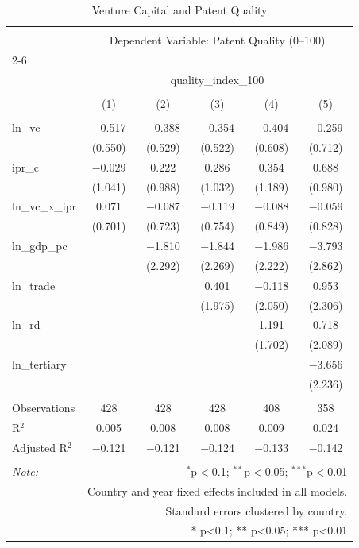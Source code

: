 
\begin{table}[!htbp] \centering 
  \caption{Venture Capital and Patent Quality} 
  \label{} 
\begin{tabular}{@{\extracolsep{5pt}}lccccc} 
\\[-1.8ex]\hline 
\hline \\[-1.8ex] 
 & \multicolumn{5}{c}{Dependent Variable: Patent Quality (0–100)} \\ 
\cline{2-6} 
\\[-1.8ex] & \multicolumn{5}{c}{quality\_index\_100} \\ 
\\[-1.8ex] & (1) & (2) & (3) & (4) & (5)\\ 
\hline \\[-1.8ex] 
 ln\_vc & $-$0.517 & $-$0.388 & $-$0.354 & $-$0.404 & $-$0.259 \\ 
  & (0.550) & (0.529) & (0.522) & (0.608) & (0.712) \\ 
  ipr\_c & $-$0.029 & 0.222 & 0.286 & 0.354 & 0.688 \\ 
  & (1.041) & (0.988) & (1.032) & (1.189) & (0.980) \\ 
  ln\_vc\_x\_ipr & 0.071 & $-$0.087 & $-$0.119 & $-$0.088 & $-$0.059 \\ 
  & (0.701) & (0.723) & (0.754) & (0.849) & (0.828) \\ 
  ln\_gdp\_pc &  & $-$1.810 & $-$1.844 & $-$1.986 & $-$3.793 \\ 
  &  & (2.292) & (2.269) & (2.222) & (2.862) \\ 
  ln\_trade &  &  & 0.401 & $-$0.118 & 0.953 \\ 
  &  &  & (1.975) & (2.050) & (2.306) \\ 
  ln\_rd &  &  &  & 1.191 & 0.718 \\ 
  &  &  &  & (1.702) & (2.089) \\ 
  ln\_tertiary &  &  &  &  & $-$3.656 \\ 
  &  &  &  &  & (2.236) \\ 
 \hline \\[-1.8ex] 
Observations & 428 & 428 & 428 & 408 & 358 \\ 
R$^{2}$ & 0.005 & 0.008 & 0.008 & 0.009 & 0.024 \\ 
Adjusted R$^{2}$ & $-$0.121 & $-$0.121 & $-$0.124 & $-$0.133 & $-$0.142 \\ 
\hline 
\hline \\[-1.8ex] 
\textit{Note:}  & \multicolumn{5}{r}{$^{*}$p$<$0.1; $^{**}$p$<$0.05; $^{***}$p$<$0.01} \\ 
 & \multicolumn{5}{r}{Country and year fixed effects included in all models.} \\ 
 & \multicolumn{5}{r}{Standard errors clustered by country.} \\ 
 & \multicolumn{5}{r}{* p<0.1; ** p<0.05; *** p<0.01} \\ 
\end{tabular} 
\end{table} 
